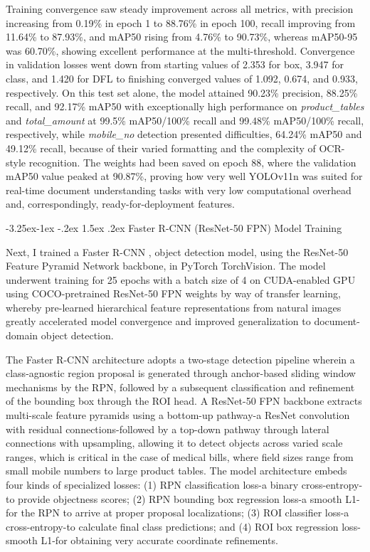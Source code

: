 \documentclass[conference,twocolumn]{IEEEtran}
\makeatletter
\renewcommand{\subsection}{\@startsection{subsection}{2}{\z@}%
  {-3.25ex\@plus -1ex \@minus -.2ex}%
  {1.5ex \@plus .2ex}%
  {\normalfont\normalsize\bfseries\itshape}}
\makeatother
\begin{document}
Training convergence saw steady improvement across all metrics, with
precision increasing from 0.19\% in epoch 1 to 88.76\% in epoch 100,
recall improving from 11.64\% to 87.93\%, and mAP50 rising from 4.76\%
to 90.73\%, whereas mAP50-95 was 60.70\%, showing excellent performance
at the multi-threshold. Convergence in validation losses went down from
starting values of 2.353 for box, 3.947 for class, and 1.420 for DFL to
finishing converged values of 1.092, 0.674, and 0.933, respectively. On
this test set alone, the model attained 90.23\% precision, 88.25\%
recall, and 92.17\% mAP50 with exceptionally high performance on
\textit{product\_tables} and \textit{total\_amount} at 99.5\% mAP50/100\%
recall and 99.48\% mAP50/100\% recall, respectively, while
\textit{mobile\_no} detection presented difficulties, 64.24\% mAP50 and
49.12\% recall, because of their varied formatting and the complexity of
OCR-style recognition. The weights had been saved on epoch 88, where the
validation mAP50 value peaked at 90.87\%, proving how very well YOLOv11n
was suited for real-time document understanding tasks with very low
computational overhead and, correspondingly, ready-for-deployment
features.

\subsection{Faster R-CNN (ResNet-50 FPN) Model Training}

Next, I trained a Faster R-CNN \cite{ref13}, \cite{ref14} object detection
model, using the ResNet-50 Feature Pyramid Network backbone, in PyTorch
TorchVision. The model underwent training for 25 epochs with a batch
size of 4 on CUDA-enabled GPU using COCO-pretrained ResNet-50 FPN
weights by way of transfer learning, whereby pre-learned hierarchical
feature representations from natural images greatly accelerated model
convergence and improved generalization to document-domain object
detection.

The Faster R-CNN architecture adopts a two-stage detection pipeline
wherein a class-agnostic region proposal is generated through
anchor-based sliding window mechanisms by the RPN, followed by a
subsequent classification and refinement of the bounding box through the
ROI head. A ResNet-50 FPN backbone extracts multi-scale feature pyramids
using a bottom-up pathway-a ResNet convolution with residual
connections-followed by a top-down pathway through lateral connections
with upsampling, allowing it to detect objects across varied scale
ranges, which is critical in the case of medical bills, where field
sizes range from small mobile numbers to large product tables. The model
architecture embeds four kinds of specialized losses: (1) RPN
classification loss-a binary cross-entropy-to provide objectness scores;
(2) RPN bounding box regression loss-a smooth L1-for the RPN to arrive
at proper proposal localizations; (3) ROI classifier loss-a
cross-entropy-to calculate final class predictions; and (4) ROI box
regression loss-smooth L1-for obtaining very accurate coordinate
refinements.
\end{document}
